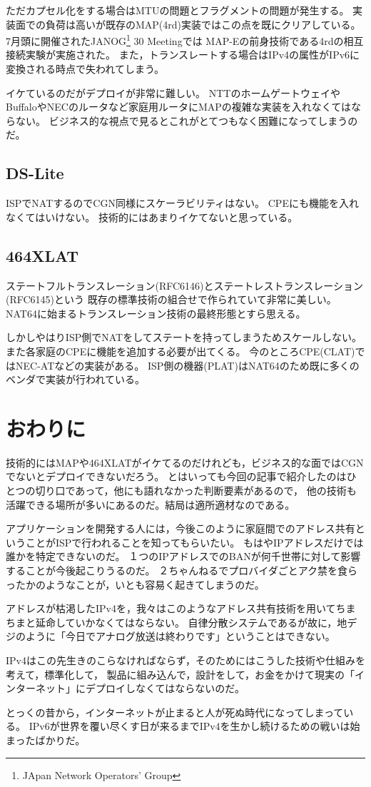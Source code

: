 ただカプセル化をする場合はMTUの問題とフラグメントの問題が発生する。
実装面での負荷は高いが既存のMAP(4rd)実装ではこの点を既にクリアしている。
7月頭に開催されたJANOG\footnote{JApan Network Operators' Group} 30 Meetingでは
MAP-Eの前身技術である4rdの相互接続実験が実施された。
また，トランスレートする場合はIPv4の属性がIPv6に変換される時点で失われてしまう。

イケているのだがデプロイが非常に難しい。
NTTのホームゲートウェイやBuffaloやNECのルータなど家庭用ルータにMAPの複雑な実装を入れなくてはならない。
ビジネス的な視点で見るとこれがとてつもなく困難になってしまうのだ。

\subsection{DS-Lite}
ISPでNATするのでCGN同様にスケーラビリティはない。
CPEにも機能を入れなくてはいけない。
技術的にはあまりイケてないと思っている。

\subsection{464XLAT}
ステートフルトランスレーション(RFC6146)とステートレストランスレーション(RFC6145)という
既存の標準技術の組合せで作られていて非常に美しい。
NAT64に始まるトランスレーション技術の最終形態とすら思える。

しかしやはりISP側でNATをしてステートを持ってしまうためスケールしない。
また各家庭のCPEに機能を追加する必要が出てくる。
今のところCPE(CLAT)ではNEC-ATなどの実装がある。
ISP側の機器(PLAT)はNAT64のため既に多くのベンダで実装が行われている。

\section{おわりに}

技術的にはMAPや464XLATがイケてるのだけれども，ビジネス的な面ではCGNでないとデプロイできないだろう。
とはいっても今回の記事で紹介したのはひとつの切り口であって，他にも語れなかった判断要素があるので，
他の技術も活躍できる場所が多いにあるのだ。結局は適所適材なのである。

アプリケーションを開発する人には，今後このように家庭間でのアドレス共有ということがISPで行われることを知ってもらいたい。
もはやIPアドレスだけでは誰かを特定できないのだ。
１つのIPアドレスでのBANが何千世帯に対して影響することが今後起こりうるのだ。
２ちゃんねるでプロバイダごとアク禁を食らったかのようなことが，いとも容易く起きてしまうのだ。

アドレスが枯渇したIPv4を，我々はこのようなアドレス共有技術を用いてちまちまと延命していかなくてはならない。
自律分散システムであるが故に，地デジのように「今日でアナログ放送は終わりです」ということはできない。

IPv4はこの先生きのこらなければならず，そのためにはこうした技術や仕組みを考えて，標準化して，
製品に組み込んで，設計をして，お金をかけて現実の「インターネット」にデプロイしなくてはならないのだ。

とっくの昔から，インターネットが止まると人が死ぬ時代になってしまっている。
IPv6が世界を覆い尽くす日が来るまでIPv4を生かし続けるための戦いは始まったばかりだ。
